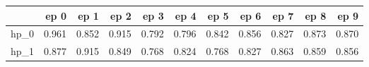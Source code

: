 \begin{tabular}{lrrrrrrrrrr}
\toprule
{} &   ep 0 &   ep 1 &   ep 2 &   ep 3 &   ep 4 &   ep 5 &   ep 6 &   ep 7 &   ep 8 &   ep 9 \\
\midrule
hp\_0 &  0.961 &  0.852 &  0.915 &  0.792 &  0.796 &  0.842 &  0.856 &  0.827 &  0.873 &  0.870 \\
hp\_1 &  0.877 &  0.915 &  0.849 &  0.768 &  0.824 &  0.768 &  0.827 &  0.863 &  0.859 &  0.856 \\
\bottomrule
\end{tabular}

